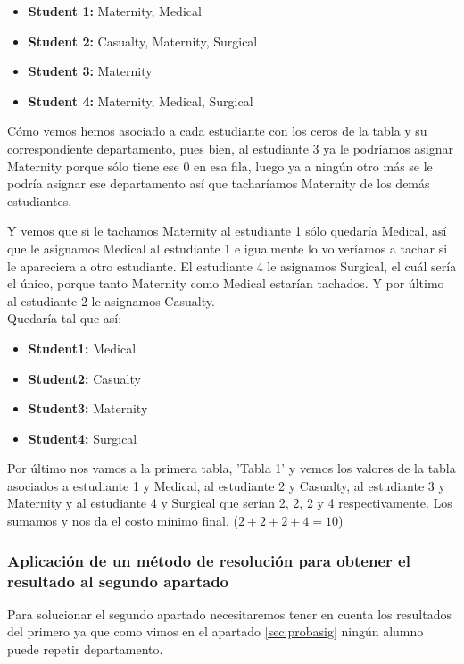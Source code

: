 \documentclass[11pt]{article}
\begin{document}
\begin{itemize}
    \item \textbf{Student 1:} Maternity, Medical
    \item \textbf{Student 2:} Casualty, Maternity, Surgical
    \item \textbf{Student 3:} Maternity
    \item \textbf{Student 4:} Maternity, Medical, Surgical
\end{itemize}{}


Cómo vemos hemos asociado a cada estudiante con los ceros de la tabla y su correspondiente departamento, pues bien, al estudiante 3 ya le podríamos asignar Maternity porque sólo tiene ese 0 en esa fila, luego ya a ningún otro más se le podría asignar ese departamento así que tacharíamos Maternity de los demás estudiantes.

Y vemos que si le tachamos Maternity al estudiante 1 sólo quedaría Medical, así que le asignamos Medical al estudiante 1 e igualmente lo volveríamos a tachar si le apareciera a otro estudiante. El estudiante 4 le asignamos Surgical, el cuál sería el único, porque tanto Maternity como Medical estarían tachados. Y por último al estudiante 2 le asignamos Casualty.\\

Quedaría tal que así: 
\begin{itemize}
    \item \textbf{Student1:} Medical
    \item \textbf{Student2:} Casualty
    \item \textbf{Student3:} Maternity
    \item \textbf{Student4:} Surgical
\end{itemize}{}

Por último nos vamos a la primera tabla, 'Tabla 1' y vemos los valores de la tabla asociados a estudiante 1 y Medical, al estudiante 2 y Casualty, al estudiante 3 y Maternity y al estudiante 4 y Surgical que serían 2, 2, 2 y 4 respectivamente. Los sumamos y nos da el costo mínimo final. ($2+2+2+4 = 10$)




\subsubsection{Aplicación de un método de resolución para obtener el resultado al segundo apartado}

Para solucionar el segundo apartado necesitaremos tener en cuenta los resultados del primero ya que como vimos en el apartado \ref{sec:probasig} ningún alumno puede repetir departamento.
\end{document}
